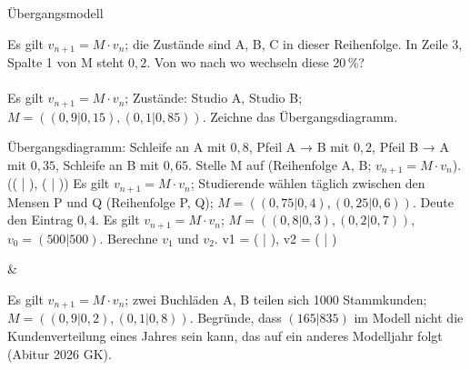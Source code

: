 \setcounter{aufgabe}{14}

\begin{aufgabe}{Übergangsmodell}
\begin{teile}
\teil Es gilt $v_{n+1} = M \cdot v_n$; die Zustände sind A, B, C in dieser Reihenfolge. In Zeile 3, Spalte 1 von M steht $0{,}2$. Von wo nach wo wechseln diese 20\,\%? \\  \\ 
\teil Es gilt $v_{n+1} = M \cdot v_n$; Zustände: Studio A, Studio B; $M = ((0{,}9 | 0{,}15), (0{,}1 | 0{,}85))$. Zeichne das Übergangsdiagramm.

\teil Übergangsdiagramm: Schleife an A mit $0{,}8$, Pfeil A → B mit $0{,}2$, Pfeil B → A mit $0{,}35$, Schleife an B mit $0{,}65$. Stelle M auf (Reihenfolge A, B; $v_{n+1} = M \cdot v_n$). (( \leerfeld | \leerfeld ), ( \leerfeld | \leerfeld ))
\teil Es gilt $v_{n+1} = M \cdot v_n$; Studierende wählen täglich zwischen den Mensen P und Q (Reihenfolge P, Q); $M = ((0{,}75 | 0{,}4), (0{,}25 | 0{,}6))$. Deute den Eintrag $0{,}4$.
\teil Es gilt $v_{n+1} = M \cdot v_n$; $M = ((0{,}8 | 0{,}3), (0{,}2 | 0{,}7))$, $v_0 = (500 | 500)$. Berechne $v_1$ und $v_2$. v1 = ( \leerfeld | \leerfeld ), v2 = ( \leerfeld | \leerfeld )
\end{teile}
\begin{gleichungsraster}[2]
 &
 \\
\end{gleichungsraster}
\begin{teile}
\teil Es gilt $v_{n+1} = M \cdot v_n$; zwei Buchläden A, B teilen sich 1000 Stammkunden; $M = ((0{,}9 | 0{,}2), (0{,}1 | 0{,}8))$. Begründe, dass $(165 | 835)$ im Modell nicht die Kundenverteilung eines Jahres sein kann, das auf ein anderes Modelljahr folgt \hfill (Abitur 2026 GK).
\end{teile}
\end{aufgabe}

